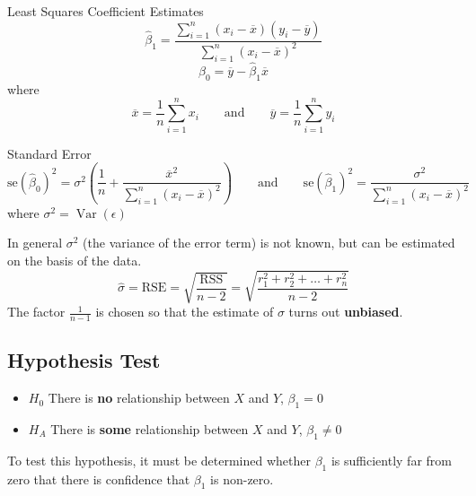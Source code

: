 \documentclass[11pt]{article}
\newcommand*\samplemean[1]{\overline{#1}}
\newcommand*\Var[1]{\mathop{\text{Var}}\left(#1\right)}
\begin{document}
\begin{definition}
	Least Squares Coefficient Estimates
	\begin{equation*}
		\hat{\beta}_1 = \frac{\sum_{i=1}^{n}(x_i - \samplemean{x})(y_i - \samplemean{y})}{\sum_{i=1}^{n}(x_i - \samplemean{x})^2}
	\end{equation*}
	\begin{equation*}
		\hat{\beta}_0 = \samplemean{y} - \hat{\beta}_1 \samplemean{x}
	\end{equation*}
	where
	\begin{equation*}
		\samplemean{x} = \frac{1}{n}\sum_{i=1}^{n} x_i\qquad\text{and}\qquad\samplemean{y} = \frac{1}{n}\sum_{i=1}^{n} y_i	
	\end{equation*}
\end{definition}

\begin{definition}
	Standard Error
	\begin{equation*}
		\text{se}(\hat{\beta}_0)^2 = \sigma^2 \left( \frac{1}{n} + \frac{\samplemean{x}^2}{\sum_{i=1}^{n}(x_i - \samplemean{x})^2} \right) \qquad\text{and}\qquad \text{se}(\hat{\beta}_1)^2 = \frac{\sigma^2}{\sum_{i=1}^{n}(x_i-\samplemean{x})^2}
	\end{equation*}
	where $\sigma^2 = \Var{\epsilon}$
\end{definition}
In general $\sigma^2$ (the variance of the error term) is not known, but can be estimated on the basis of the data.
\begin{equation*}
	\hat{\sigma} = \text{RSE} = \sqrt{\frac{\text{RSS}}{n-2}} = \sqrt{\frac{r_1^2 + r_2^2 + \dots + r_n^2}{n-2}}
\end{equation*}
The factor $\frac{1}{n-1}$ is chosen so that the estimate of $\sigma$ turns out \textbf{unbiased}.

\subsection{Hypothesis Test}
\begin{itemize}[noitemsep]
	\item $H_0$ There is \textbf{no} relationship between $X$ and $Y$, \quad $\beta_1 = 0$
	\item $H_A$ There is \textbf{some} relationship between $X$ and $Y$, \quad $\beta_1 \neq 0$
\end{itemize}
To test this hypothesis, it must be determined whether $\beta_1$ is sufficiently far from zero that there is confidence that $\beta_1$ is non-zero.
\end{document}
